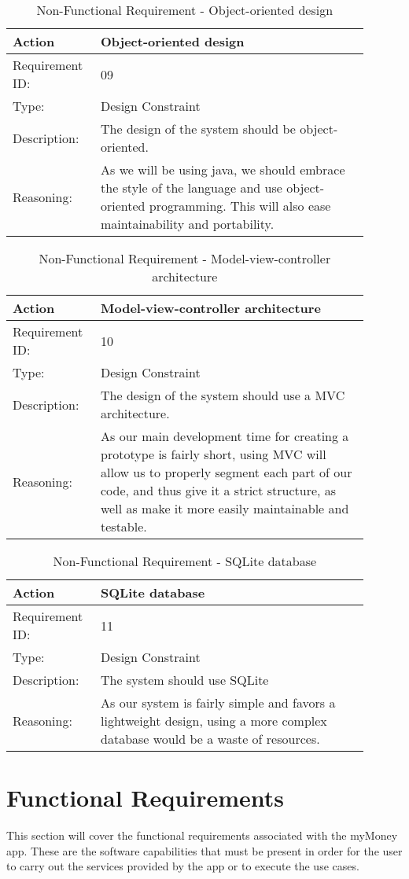 \documentclass[11pt]{article}
\newcounter{use case ID}
\newcommand\addrow[2]{#1 & #2\\ \hline}
\newcounter{req ID}
\newcommand\tabularheadfsd[1]{
\begin{table}[ht]
    \addtocounter{req ID}{1}
    \caption{Non-Functional Requirement \arabic{req ID} - #1}
    \vspace{0.2cm}
    \begin{tabular}{|p{0.2\linewidth}|p{0.70\linewidth}|}
    \hline
        \textbf{Action} & \textbf{#1} \\
        \hline}
\newenvironment{requirement}{\tabularheadfsd}
{\hline\end{tabular}\end{table}}
\begin{document}
\begin{requirement}{Object-oriented design}
    \addrow{Requirement ID:}{09}
    \addrow{Type:}{Design Constraint}
    \addrow{Description:}{The design of the system should be object-oriented.}
    \addrow{Reasoning:}{As we will be using java, we should embrace the style of the language and use object-oriented programming. This will also ease maintainability and portability.}
    \end{requirement}

    \begin{requirement}{Model-view-controller architecture}
    \addrow{Requirement ID:}{10}
    \addrow{Type:}{Design Constraint}
    \addrow{Description:}{The design of the system should use a MVC architecture.}
    \addrow{Reasoning:}{As our main development time for creating a prototype is fairly short, using MVC will allow us to properly segment each part of our code, and thus give it a strict structure, as well as make it more easily maintainable and testable.}
    \end{requirement}

    \begin{requirement}{SQLite database}
    \addrow{Requirement ID:}{11}
    \addrow{Type:}{Design Constraint}
    \addrow{Description:}{The system should use SQLite}
    \addrow{Reasoning:}{As our system is fairly simple and favors a lightweight design, using a more complex database would be a waste of resources.}
    \end{requirement}

\clearpage

\section{Functional Requirements}

This section will cover the functional requirements associated with the myMoney app. These are the software capabilities that must be present in order for the user to carry out the services provided by the app or to execute the use cases.
\end{document}
